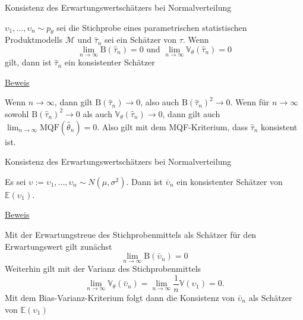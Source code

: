 \documentclass[
  8pt,
  ignorenonframetext,
]{beamer}
\newcommand{\ups} {\upsilon}
\begin{document}
\begin{frame}{Konsistenz des Erwartungswertschätzers bei
Normalverteilung}
\protect\hypertarget{konsistenz-des-erwartungswertschuxe4tzers-bei-normalverteilung-1}{}
\small
\begin{theorem}
\normalfont
\justifying
$\ups_1,...,\ups_n \sim p_\theta$ sei die Stichprobe eines parametrischen statistischen
Produktmodells $\mathcal{M}$ und $\hat{\tau}_n$ sei ein Schätzer von $\tau$. Wenn
\begin{equation}
\lim_{n\to \infty} \mbox{B}(\hat{\tau}_n) = 0
\mbox{ und }
\lim_{n\to \infty} \mathbb{V}_\theta(\hat{\tau}_n) = 0
\end{equation}
gilt, dann ist $\hat{\tau}_n$ ein konsistenter Schätzer
\end{theorem}
\footnotesize

\underline{Beweis}

Wenn \(n \to \infty\), dann gilt \(\mbox{B}(\hat{\tau}_n) \to 0\), also
auch \(\mbox{B}(\hat{\tau}_n)^2 \to 0\). Wenn für \(n \to \infty\)
sowohl \(\mbox{B}(\hat{\tau}_n)^2 \to 0\) als auch
\(\mathbb{V}_\theta(\hat{\tau}_n) \to 0\), dann gilt auch
\(\lim_{n\to \infty} \mbox{MQF}(\hat{\theta}_n) = 0\). Also gilt mit dem
MQF-Kriterium, dass \(\hat{\tau}_n\) konsistent ist.
\end{frame}

\begin{frame}{Konsistenz des Erwartungswertschätzers bei
Normalverteilung}
\protect\hypertarget{konsistenz-des-erwartungswertschuxe4tzers-bei-normalverteilung-2}{}
\small
\begin{theorem} 
\justifying
\normalfont
Es sei $\ups := \ups_1,...,\ups_n \sim N(\mu,\sigma^2)$. Dann ist $\bar{\ups}_n$
ein konsistenter Schätzer von $\mathbb{E}(\ups_1)$.
\end{theorem}
\footnotesize

\underline{Beweis}

Mit der Erwartungstreue des Stichprobenmittels als Schätzer für den
Erwartungswert gilt zunächst \begin{equation}
\lim_{n \to \infty} \mbox{B}(\bar{\ups}_n) =  0
\end{equation} Weiterhin gilt mit der Varianz des Stichprobenmittels
\begin{equation}
\lim_{n \to \infty} \mathbb{V}_\theta(\bar{\ups}_n) = \lim_{n\to \infty} \frac{1}{n}\mathbb{V}(\ups_1) = 0.
\end{equation} Mit dem Bias-Varianz-Kriterium folgt dann die Konsistenz
von \(\bar{\ups}_n\) als Schätzer von \(\mathbb{E}(\ups_1)\)
\end{frame}
\end{document}
